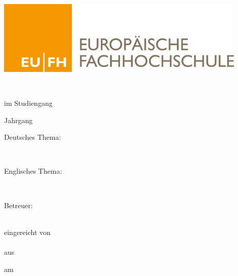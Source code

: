 \begin{titlepage}

	\frontmatter

	\begin{center}
    \includegraphics[width=12cm]{abbildungen/00EufhLogo} \\
    \vspace{3cm}
		
		\textsc{\ArtDerArbeit}\\
		\vspace{.5cm}
		
		im Studiengang \Studiengang \\
		\vspace{.5cm}
		
		Jahrgang \Jahrgang \\
		\vspace{2cm}
		
		Deutsches Thema:\\
		\vspace{.5cm}
		
		\textbf{\DeutschesThema}\\
		\vspace{2cm}
		
		Englisches Thema:\\
		\vspace{.5cm}		
		
		\textbf{\EnglischesThema}\\
		\vspace{2cm}
		
		Betreuer: \\ \Betreuer \\
		\vspace{1cm}		
		
		eingereicht von \\ \Autor \\ aus \Wohnort \\
		\vspace{1cm}
		
		am \Datum \\
		\vspace{.5cm}
	\end{center}
	
\end{titlepage}

